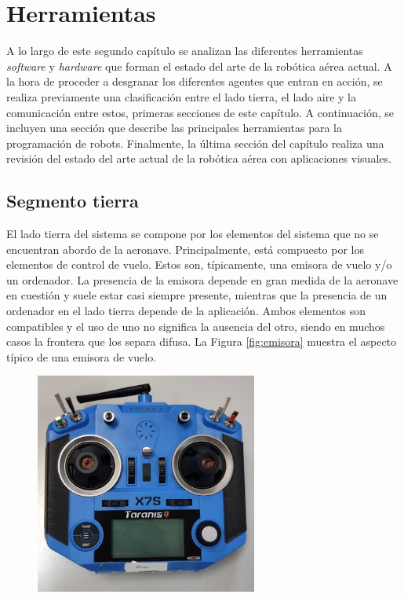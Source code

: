 \documentclass[../main.tex]{subfiles}
\begin{document}
\chapter{Herramientas} \label{cap:herram}
A lo largo de este segundo capítulo se analizan las diferentes herramientas \emph{software} y \emph{hardware} que forman el estado del arte de la robótica aérea actual. A la hora de proceder a desgranar los diferentes agentes que entran en acción, se realiza previamente una clasificación entre el lado tierra, el lado aire y la comunicación entre estos, primeras secciones de este capítulo. A continuación, se incluyen una sección que describe las principales herramientas para la programación de robots. Finalmente, la última sección del capítulo realiza una revisión del estado del arte actual de la robótica aérea con aplicaciones visuales.

\section{Segmento tierra} \label{section:herram-tierra}
El lado tierra del sistema se compone por los elementos del sistema que no se encuentran abordo de la aeronave. Principalmente, está compuesto por los elementos de control de vuelo. Estos son, típicamente, una emisora de vuelo y/o un ordenador. La presencia de la emisora depende en gran medida de la aeronave en cuestión y suele estar casi siempre presente, mientras que la presencia de un ordenador en el lado tierra depende de la aplicación. Ambos elementos son compatibles y el uso de uno no significa la ausencia del otro, siendo en muchos casos la frontera que los separa difusa. La Figura \ref{fig:emisora} muestra el aspecto típico de una emisora de vuelo.

\begin{figure}[H]
 	{\includegraphics[width=0.65\textwidth]{imgs/02/taranis.jpg}}
\end{figure}
\end{document}
